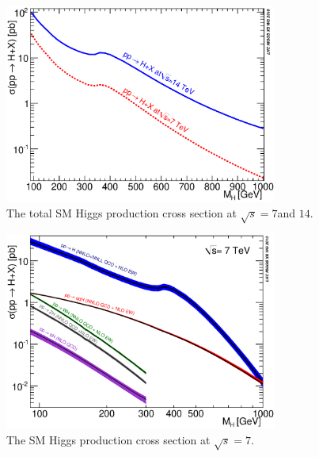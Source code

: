 \begin{figure}[ht]
	\begin{center}
	\includegraphics[width=0.8\textwidth]{YRHXS_Summary/YRHXS_Summary_fig1.eps}
	\caption{The total SM Higgs production cross section at
	$\sqrt{s} = 7$\UTeV and $14$\UTeV.}
	\label{fig:totalXS}
	\end{center}
\end{figure}

\begin{figure}[p]
	\begin{center}
	\includegraphics[width=0.8\textwidth]{YRHXS_Summary/YRHXS_Summary_fig2.eps}
	\caption{The SM Higgs production cross section at $\sqrt{s} = 7$\UTeV.}
	\label{fig:SMXS7TeV}
	\end{center}
\end{figure}

